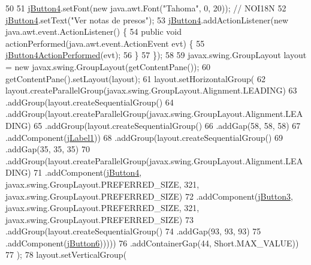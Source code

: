 \begin{DoxyCode}
50 
51         \mbox{\hyperlink{classsoftware_1_1elegirprof_a9b56596496adced58249f364ee8944b2}{jButton4}}.setFont(\textcolor{keyword}{new} java.awt.Font(\textcolor{stringliteral}{"Tahoma"}, 0, 20)); \textcolor{comment}{// NOI18N}
52         \mbox{\hyperlink{classsoftware_1_1elegirprof_a9b56596496adced58249f364ee8944b2}{jButton4}}.setText(\textcolor{stringliteral}{"Ver notas de presos"});
53         \mbox{\hyperlink{classsoftware_1_1elegirprof_a9b56596496adced58249f364ee8944b2}{jButton4}}.addActionListener(\textcolor{keyword}{new} java.awt.event.ActionListener() \{
54             \textcolor{keyword}{public} \textcolor{keywordtype}{void} actionPerformed(java.awt.event.ActionEvent evt) \{
55                 \mbox{\hyperlink{classsoftware_1_1elegirprof_a321037ccc1de9fd2bebbfe84eed2d536}{jButton4ActionPerformed}}(evt);
56             \}
57         \});
58 
59         javax.swing.GroupLayout layout = \textcolor{keyword}{new} javax.swing.GroupLayout(getContentPane());
60         getContentPane().setLayout(layout);
61         layout.setHorizontalGroup(
62             layout.createParallelGroup(javax.swing.GroupLayout.Alignment.LEADING)
63             .addGroup(layout.createSequentialGroup()
64                 .addGroup(layout.createParallelGroup(javax.swing.GroupLayout.Alignment.LEADING)
65                     .addGroup(layout.createSequentialGroup()
66                         .addGap(58, 58, 58)
67                         .addComponent(\mbox{\hyperlink{classsoftware_1_1elegirprof_a922b779cc2161f5cc8f9f4bff21fb1db}{jLabel1}}))
68                     .addGroup(layout.createSequentialGroup()
69                         .addGap(35, 35, 35)
70                         .addGroup(layout.createParallelGroup(javax.swing.GroupLayout.Alignment.LEADING)
71                             .addComponent(\mbox{\hyperlink{classsoftware_1_1elegirprof_a9b56596496adced58249f364ee8944b2}{jButton4}}, javax.swing.GroupLayout.PREFERRED\_SIZE, 321, 
      javax.swing.GroupLayout.PREFERRED\_SIZE)
72                             .addComponent(\mbox{\hyperlink{classsoftware_1_1elegirprof_af66925a660384d3f86f5cb3459c9acd0}{jButton3}}, javax.swing.GroupLayout.PREFERRED\_SIZE, 321, 
      javax.swing.GroupLayout.PREFERRED\_SIZE)
73                             .addGroup(layout.createSequentialGroup()
74                                 .addGap(93, 93, 93)
75                                 .addComponent(\mbox{\hyperlink{classsoftware_1_1elegirprof_a230246a01ebe054fe6b990811ba3c403}{jButton6}})))))
76                 .addContainerGap(44, Short.MAX\_VALUE))
77         );
78         layout.setVerticalGroup(

\end{DoxyCode}
